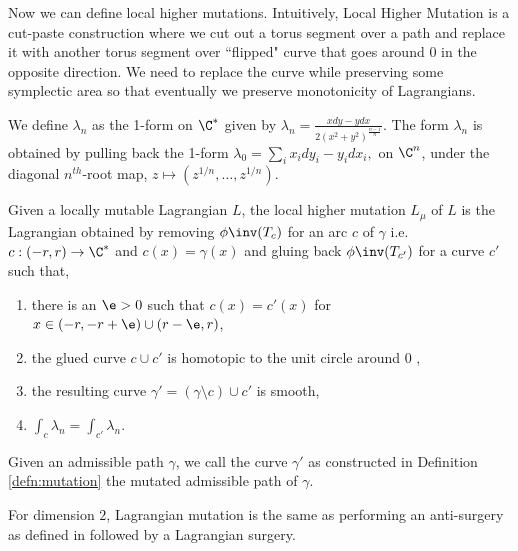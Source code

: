 Now we can define local higher mutations.  Intuitively,  Local Higher Mutation is a cut-paste construction where we cut out a torus segment over a path and replace it with another torus segment over ``flipped" curve that goes around $0$ in the opposite direction.  We need to replace the curve while preserving some symplectic area so that eventually we preserve monotonicity of Lagrangians.  

\begin{defn}\label{defn:lambdan}
   We define $\lambda_n$ as the  1-form  on $\C^*$ given by  $\lambda_n = \frac{xdy-ydx}{2(x^2+y^2)^{\frac{n-1}{n}}}$.  The form $\lambda_n$ is obtained by pulling back the 1-form $\lambda_0 = \sum_i x_idy_i - y_idx_i,$ on $\C^n$, under the diagonal $n^{th}$-root map, $z\mapsto (z^{1/n},  \dots,  z^{1/n})$.   
\end{defn}

\begin{defn}\label{defn:mutation}
 Given a locally mutable Lagrangian $L$,  the local higher mutation $L_\mu$ of $L$ is the Lagrangian obtained by removing $\phi\inv ( T_c)$  for an arc $c$ of $\gamma$ i.e.  $c:(-r, r) \to \C^*$ and $c(x)=\gamma(x)$ and gluing back $\phi \inv (T_{c'})$ for a curve $c'$  such that,
 \begin{enumerate}
    
     \item there is an $\e>0$ such that $c(x)= c'(x)$ for $x\in (-r, -r+\e) \cup (r-\e, r)$,
     \item the glued curve $c\cup c'$ is homotopic to the unit circle around 0 ,
     \item the resulting curve $\gamma' = (\gamma \setminus c )\cup c'$ is smooth,
     \item $\int_c \lambda_n = \int_{c'} \lambda_n$.
 \end{enumerate}
\end{defn}

\begin{defn}
    Given an admissible path $\gamma$, we call the curve $\gamma'$ as constructed in Definition \ref{defn:mutation} the mutated admissible path of $\gamma$.
\end{defn}


\begin{remark}
For dimension $2$, Lagrangian mutation is the same as performing an anti-surgery as defined in \cite{haug} followed by a Lagrangian surgery. 
\end{remark}

